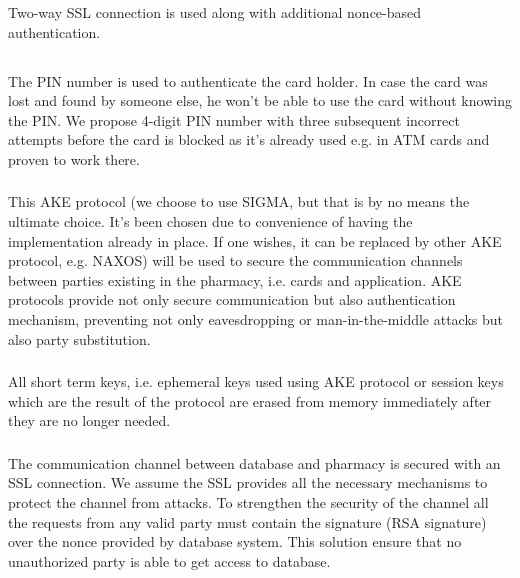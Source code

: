 \subsubsection{}
Two-way SSL connection is used along with additional nonce-based authentication.

\subsection{}

\subsubsection{}
The PIN number is used to authenticate the card holder. In case the card was lost and found by someone else, he won't be able to use the card without knowing the PIN. We propose 4-digit PIN number with three subsequent incorrect attempts before the card is blocked as it's already used e.g. in ATM cards and proven to work there.

\subsubsection{}
This AKE protocol (we choose to use SIGMA, but that is by no means the ultimate choice. It's been chosen due to convenience of having the implementation already in place. If one wishes, it can be replaced by other AKE protocol, e.g. NAXOS) will be used to secure the communication channels between parties existing in the pharmacy, i.e. cards and application. AKE protocols provide not only secure communication but also authentication mechanism, preventing not only eavesdropping or man-in-the-middle attacks but also party substitution.

\subsubsection{}
All short term keys, i.e. ephemeral keys used using AKE protocol or session keys which are the result of the protocol are erased from memory immediately after they are no longer needed.

\subsubsection{}
The communication channel between database and pharmacy is secured with an SSL connection. We assume the SSL provides all the necessary mechanisms to protect the channel from attacks. To strengthen the security of the channel all the requests from any valid party must contain the signature (RSA signature) over the nonce provided by database system. This solution ensure that no unauthorized party is able to get access to database.

